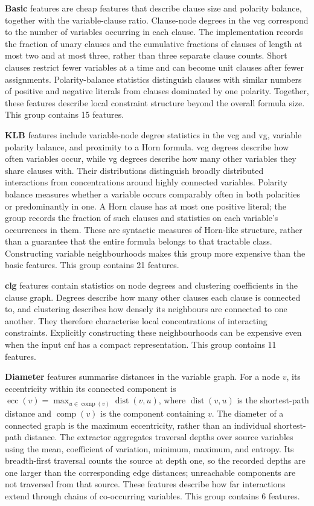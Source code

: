 \noindent\textbf{Basic} features are cheap features that describe clause size and polarity balance, together with the variable-clause ratio. Clause-node degrees in the \gls{vcg} correspond to the number of variables occurring in each clause. The implementation records the fraction of unary clauses and the cumulative fractions of clauses of length at most two and at most three, rather than three separate clause counts. Short clauses restrict fewer variables at a time and can become unit clauses after fewer assignments. Polarity-balance statistics distinguish clauses with similar numbers of positive and negative literals from clauses dominated by one polarity. Together, these features describe local constraint structure beyond the overall formula size. This group contains 15 features.

\noindent\textbf{KLB} features include variable-node degree statistics in the \gls{vcg} and \gls{vg}, variable polarity balance, and proximity to a Horn formula. \gls{vcg} degrees describe how often variables occur, while \gls{vg} degrees describe how many other variables they share clauses with. Their distributions distinguish broadly distributed interactions from concentrations around highly connected variables. Polarity balance measures whether a variable occurs comparably often in both polarities or predominantly in one. A Horn clause has at most one positive literal; the group records the fraction of such clauses and statistics on each variable's occurrences in them. These are syntactic measures of Horn-like structure, rather than a guarantee that the entire formula belongs to that tractable class. Constructing variable neighbourhoods makes this group more expensive than the basic features. This group contains 21 features.

\noindent\textbf{\Gls{clg}} features contain statistics on node degrees and clustering coefficients in the clause graph. Degrees describe how many other clauses each clause is connected to, and clustering describes how densely its neighbours are connected to one another. They therefore characterise local concentrations of interacting constraints. Explicitly constructing these neighbourhoods can be expensive even when the input \gls{cnf} has a compact representation. This group contains 11 features.

\noindent\textbf{Diameter} features summarise distances in the variable graph. For a node $v$, its eccentricity within its connected component is $\operatorname{ecc}(v)=\max_{u\in\operatorname{comp}(v)}\operatorname{dist}(v,u)$, where $\operatorname{dist}(v,u)$ is the shortest-path distance and $\operatorname{comp}(v)$ is the component containing $v$. The diameter of a connected graph is the maximum eccentricity, rather than an individual shortest-path distance. The extractor aggregates traversal depths over source variables using the mean, coefficient of variation, minimum, maximum, and entropy. Its breadth-first traversal counts the source at depth one, so the recorded depths are one larger than the corresponding edge distances; unreachable components are not traversed from that source. These features describe how far interactions extend through chains of co-occurring variables. This group contains 6 features.

